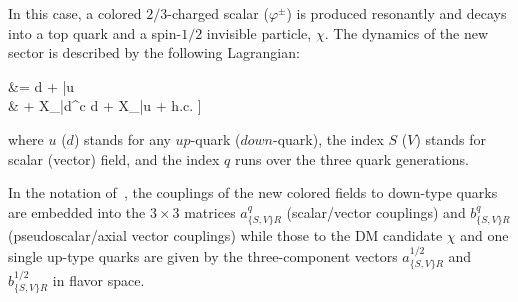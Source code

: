 \label{sec:ResonantProd}

In this case, a colored $2/3$-charged scalar ($\varphi^{\pm}$) is produced resonantly and decays into a top quark and a spin-$1/2$ invisible particle, $\chi$.  The dynamics of the new sector is described by the following Lagrangian:

\be\label{eq:lagrangianResonant}\bsp
\lag &=
\bigg[
\varphi \bar d^c
\Big[a^q_{SR} + b^q_{SR} \gamma_5 \Big] d +
\varphi \bar u  \chi
%
\\ &
+ X_\mu \bar d^c\gmu
{} d
%
+ X_\mu \bar u \gmu
{} \chi + 
{\rm h.c.} \bigg] 
\esp\ee


where $u$ ($d$) stands for any $up$-quark ($down$-quark), 
the index $S$ ($V$) stands for scalar (vector) field, and the index $q$ 
runs over the three quark generations. 


In the notation of~\cite{Agram:2013wda}, 
the couplings of the new colored fields to down-type quarks are
embedded into the $3\times 3$ matrices
$a^q_{\{S,V\}R}$ (scalar/vector couplings) and $b^q_{\{S,V\}R}$ (pseudoscalar/axial vector couplings)
while those to the DM candidate $\chi$ and one
single up-type quarks are given by the three-component vectors
$a^{1/2}_{\{S,V\}R}$ and $b^{1/2}_{\{S,V\}R}$
in flavor space. 

